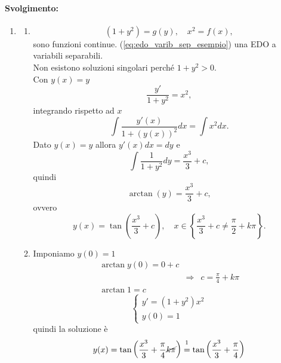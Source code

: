 \begin{example}
	\paragraph{Svolgimento:}
	\begin{enumerate}
		\item
		\begin{enumerate}
			\item \begin{equation*}
				(1+y^2)=g(y),\quad x^2=f(x),
			\end{equation*}
			sono funzioni continue. (\ref{eq:edo_varib_sep_esempio}) una EDO a variabili separabili.\\
			Non esistono soluzioni singolari perché $1+y^2>0$.\\
			Con $y(x)=y$
			\begin{equation*}
				\frac{y'}{1+y^2} = x^2,
			\end{equation*}
			integrando rispetto ad $x$
			\begin{equation*}
				\int\frac{y'(x)}{1+(y(x))^2} dx= \int x^2 dx.
			\end{equation*}
			Dato $y(x)=y$ allora $y'(x)dx=dy$ e
			\begin{equation*}
				\int\frac{1}{1+y^2}dy=\frac{x^3}{3} + c,
			\end{equation*}
			quindi
			\begin{equation*}
				\arctan(y)=\frac{x^3}{3}+c,
			\end{equation*}
			ovvero
			\begin{equation*}
				y(x)=\tan\left(\frac{x^3}{3}+c\right),\quad x\in\left\{\frac{x^3}{3}+c\neq\frac{\pi}{2}+k\pi\right\}.
			\end{equation*}
			\item Imponiamo $y(0)=1$
			\begin{equation*}
				\begin{matrix}
					\arctan y(0)=0+c&&\\
					&\Rightarrow& c=\frac{\pi}{4}+k\pi\\
					\arctan 1=c
				\end{matrix}
			\end{equation*}
			\begin{equation}\label{eq:sistema_cond_iniziale}
				\begin{cases}
					y'=(1+y^2)x^2\\
					y(0)=1
				\end{cases}
			\end{equation}
			quindi la soluzione è
			\begin{equation}\label{eq:soluzione_prob_cauchy_autoval}
				y(x)=\tan\left(\frac{x^3}{3}+\frac{\pi}{4}\cancel{k\pi}\right) \overset{\footnotemark}{=}\tan\left(\frac{x^3}{3}+\frac{\pi}{4}\right)
			\end{equation}

\end{enumerate}
\end{enumerate}
\end{example}
